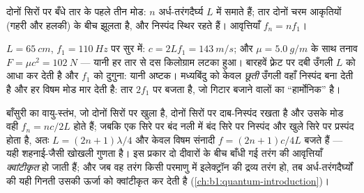 \begin{omfigure}

{\small दोनों सिरों पर बँधे तार के पहले तीन मोड: $n$ अर्ध-तरंगदैर्घ्य
$L$ में समाते हैं; तार दोनों चरम आकृतियों (गहरी और हलकी) के बीच झूलता
है, और निस्पंद स्थिर रहते हैं। आवृत्तियाँ $f_n = nf_1$।}
\end{omfigure}

\begin{example}[गिटार का एक तार]\label{ex:b1:wave-propagation:guitar}
$L = \qty{65}{cm}$, $f_1 = \qty{110}{Hz}$ पर सुर में: $c = 2Lf_1 =
\qty{143}{m/s}$; और $\mu = \qty{5.0}{g/m}$ के साथ तनाव $F = \mu c^2
= \qty{102}{N}$ --- यानी हर तार से दस किलोग्राम लटका हुआ। बारहवें फ़्रेट पर
दबी उँगली $L$ को आधा कर देती है और $f_1$ को दुगुना: यानी अष्टक।
मध्यबिंदु को केवल \emph{छूती} उँगली वहाँ निस्पंद बना देती है और हर विषम मोड
मार देती है: तार $2f_1$ पर बजता है, जो गिटार बजाने वालों का ``हार्मोनिक''
है।
\end{example}

\begin{remark}[नलियाँ, और एक झलक]\label{rem:b1:wave-propagation:pipes}
बाँसुरी का वायु-स्तंभ, जो दोनों सिरों पर खुला है, दोनों सिरों पर दाब-निस्पंद
रखता है और उसके मोड वही $f_n = nc/2L$ होते हैं; जबकि एक सिरे पर बंद नली में
बंद सिरे पर निस्पंद और खुले सिरे पर प्रस्पंद होता है, अतः
$L = (2n + 1)\lambda/4$ और केवल विषम संनादी $f = (2n + 1)c/4L$
बजते हैं --- यही शहनाई-जैसी खोखली गुणता है। इस प्रकार दो दीवारों के बीच बाँधी
गई तरंग की आवृत्तियाँ \emph{क्वांटीकृत} हो जाती हैं; और जब वह तरंग किसी परमाणु
में इलेक्ट्रॉन की द्रव्य तरंग हो, तब अर्ध-तरंगदैर्घ्यों की यही गिनती उसकी
ऊर्जा को क्वांटीकृत कर देती है (\cref{ch:b1:quantum-introduction})।
\end{remark}

